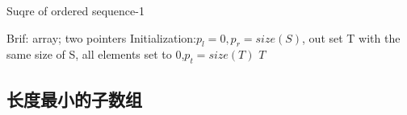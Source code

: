 \documentclass[UTF8]{../computerUniverse}
\begin{document}
\begin{algorithm}[h]%
  \caption{Suqre of ordered sequence-1}\label{algo:Suqre of ordered sequence-1}
  \SetAlgoLined
  Brif: array; two pointers\;
  \KwIn{ordered set $S = [l,r), l = S[0]$.}
  Initialization:$p_{l} = 0,p_{r} = size(S)$, out set T with the same size of S, all elements set to 0,$p_{t} = size(T)$\;
  \For {$i : [0, size(S))$}{
    $S[i] \leftarrow S[i] ^2$
  }
  \KwRet $T$\;
\end{algorithm}



\subsection{长度最小的子数组}
\end{document}
